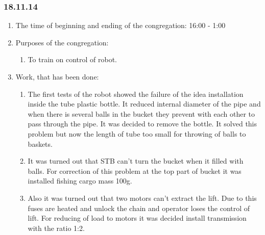 \subsubsection{18.11.14}

\begin{enumerate}
	\item The time of beginning and ending of the congregation:
	16:00 - 1:00
	\item Purposes of the congregation:
	\begin{enumerate}
	  \item To train on control of robot.
	  
    \end{enumerate}
    
	\item Work, that has been done:
	\begin{enumerate}
	  \item The first tests of the robot showed the failure of the idea installation inside the tube plastic bottle. It reduced internal diameter of the pipe and when there is several balls in the bucket they prevent with each other to pass through the pipe. It was decided to remove the bottle. It solved this problem but now the length of tube too small for throwing of balls to baskets.
      
      \item It was turned out that STB can't turn the bucket when it filled with balls. For correction of this problem at the top part of bucket it was installed fishing cargo mass 100g.
      
      
      \item Also it was turned out that two motors can't extract the lift. Due to this fuses are heated and unlock the chain and operator loses the control of lift. For reducing of load to motors it was decided install transmission with the ratio 1:2.
      
      

\end{enumerate}
\end{enumerate}
